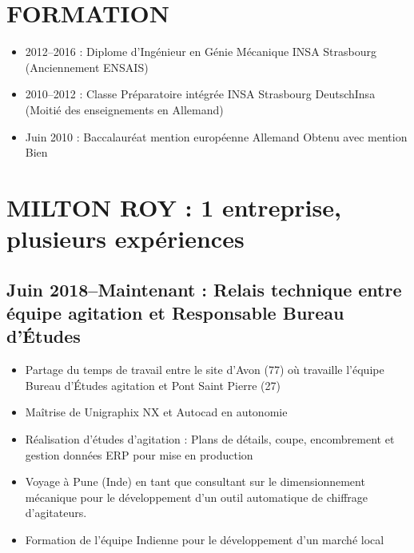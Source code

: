 \documentclass[10pt,a4paper,sans]{article}
\begin{document}
\begin{minipage}[t]{0.70\textwidth}
    \vspace{0.15cm}
    \section{FORMATION}
        \begin{itemize}
            \item{2012--2016 : Diplome d'Ingénieur en Génie Mécanique INSA Strasbourg (Anciennement ENSAIS)}
            \item{2010--2012 : Classe Préparatoire intégrée INSA Strasbourg DeutschInsa (Moitié des enseignements en Allemand)}
            \item{Juin 2010 : Baccalauréat mention européenne Allemand Obtenu avec mention Bien}
        \end{itemize}

    \section{MILTON ROY : 1 entreprise, plusieurs expériences}
    \subsection{Juin 2018--Maintenant : Relais technique entre équipe agitation et Responsable Bureau d'Études}
    \begin{itemize}%
        \item Partage du temps de travail entre le site d’Avon (77) où travaille l’équipe Bureau d’Études agitation et Pont Saint Pierre (27)
        \item Maîtrise de Unigraphix NX et Autocad en autonomie
        \item Réalisation d’études d’agitation : Plans de détails, coupe, encombrement et gestion données ERP pour mise en production
        \item Voyage à Pune (Inde) en tant que consultant sur le dimensionnement mécanique pour le développement d’un outil automatique de chiffrage d’agitateurs.
        \item Formation de l’équipe Indienne pour le développement d’un marché local
    \end{itemize}


\end{minipage}
\end{document}
